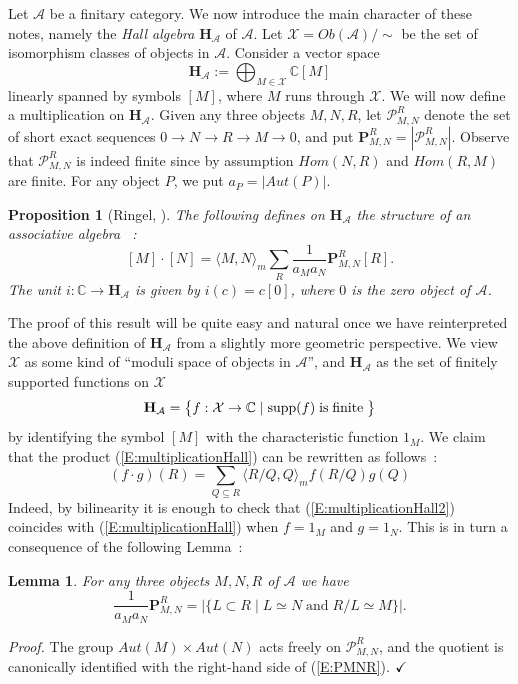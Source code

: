 \documentclass[a4paper,10pt]{amsart}
\def\H{\mathbf{H}}
\def\qed{$\hfill \checkmark$}
\def\C{\mathbb{C}}
\def\A{\mathcal{A}}
\newtheorem{lem}[theo]{Lemma}
\newtheorem{prop}[theo]{Proposition}
\numberwithin{equation}{section}
\begin{document}
Let $\mathcal{A}$ be a finitary category. We now introduce the main character of these notes, namely the \textit{Hall algebra} $\H_{\mathcal{A}}$ of $\A$. Let $\mathcal{X}={Ob}(\mathcal{A})/\sim$ be the set of isomorphism classes of objects in $\mathcal{A}$. Consider a vector space
$$\H_{\mathcal{A}}:=\bigoplus_{M \in \mathcal{X}} \C[M]$$
linearly spanned by symbols $[M]$, where $M$ runs through $\mathcal{X}$. We will now define a multiplication on $\H_{\mathcal{A}}$. Given any three objects $M,N,R$, let $\mathcal{P}_{M,N}^R$ denote the set of short exact sequences $0 \to N \to R \to M \to 0$, and put $\mathbf{P}_{M,N}^R=|\mathcal{P}_{M,N}^R|$. Observe that $\mathcal{P}_{M,N}^R$ is indeed finite since by assumption
${Hom}(N,R)$ and ${Hom}(R,M)$ are finite. For any object $P$, we put $a_{P}=|{Aut}(P)|$.

\begin{prop}[Ringel, \cite{R2}]\label{P:multiplicationHall} The following defines on $\H_{\mathcal{A}}$ the structure of an associative algebra ~:
\begin{equation}\label{E:multiplicationHall}
[M] \cdot [N]=\langle M,N\rangle_m \sum_R \frac{1}{a_M a_N}\mathbf{P}_{M,N}^R [R].
\end{equation}
The unit $i: \C \to \H_{\A}$ is given by $i(c)=c[0]$, where $0$ is the zero object of $\mathcal{A}$.
\end{prop}

The proof of this result will be quite easy and natural once we have reinterpreted the above definition of $\H_{\mathcal{A}}$ from a slightly more geometric perspective. We view $\mathcal{X}$ as some kind of ``moduli space of objects in $\mathcal{A}$'', and $\mathbf{H}_{\mathcal{A}}$ as the set of finitely supported functions on $\mathcal{X}$
$$\mathbf{H}_{\mathcal{A}}=\big\{f: \mathcal{X} \to \C\;|\; \text{supp}(f) \;\text{is\;finite}\;\big\}$$
by identifying the symbol $[M]$ with the characteristic function $1_M$. We claim that the product
(\ref{E:multiplicationHall}) can be rewritten as follows~:
\begin{equation}\label{E:multiplicationHall2}
(f \cdot g) (R)=\sum_{Q \subseteq R} \langle R/Q,Q \rangle_m f(R/Q)g(Q)
\end{equation}
Indeed, by bilinearity it is enough to check that (\ref{E:multiplicationHall2}) coincides with (\ref{E:multiplicationHall}) when $f=1_M$ and $g=1_N$. This is in turn a consequence of the following Lemma~:

\begin{lem} For any three objects $M,N,R$ of $\mathcal{A}$ we have
\begin{equation}\label{E:PMNR}
\frac{1}{a_Ma_N}\mathbf{P}^R_{M,N}=\left| \big\{ L \subset R\;|\;L \simeq N \;\text{and}\; R/L \simeq M\big\}\right|.
\end{equation}
\end{lem}
\noindent
\textit{Proof.} The group ${Aut}(M)\times {Aut}(N)$ acts freely on $\mathcal{P}_{M,N}^R$, and  the quotient is canonically identified with the right-hand side of (\ref{E:PMNR}). \qed
\end{document}
